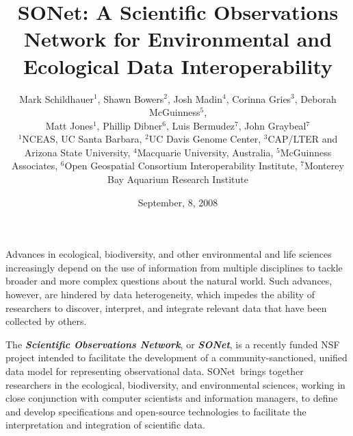\documentclass[10pt,twocolumn]{article}
\newcommand{\mypara}{\vspace{6pt}\noindent}
\newcommand{\sonet}{{SONet}}
\begin{document}

\title{\textbf{\sonet: A Scientific Observations Network for
    Environmental and Ecological Data Interoperability}}

\author{Mark Schildhauer$^1$, Shawn Bowers$^2$, Josh Madin$^4$,
  Corinna Gries$^3$, Deborah McGuinness$^5$, \\
  Matt Jones$^1$, Phillip Dibner$^6$, Luis
  Bermudez$^7$, John Graybeal$^7$ \\[12pt]
  $^1$NCEAS, UC Santa Barbara, $^2$UC Davis Genome Center,
  $^3$CAP/LTER and \\ Arizona State University, $^4$Macquarie
  University, Australia, $^5$McGuinness \\ Associates, $^6$Open
  Geospatial Consortium Interoperability Institute, $^7$Monterey \\
  Bay Aquarium Research Institute}

\date{September, 8, 2008}


\maketitle

\thispagestyle{empty}


\mypara Advances in ecological, biodiversity, and other environmental
and life sciences increasingly depend on the use of information from
multiple disciplines to tackle broader and more complex questions
about the natural world.  Such advances, however, are hindered by data
heterogeneity, which impedes the ability of researchers to discover,
interpret, and integrate relevant data that have been collected by
others.

\mypara The \emph{\textbf{Scientific Observations Network}}, or
  \emph{\textbf{\sonet}}, is a recently funded NSF project intended to
facilitate the development of a community-sanctioned, unified data
model for representing observational data.  \sonet\ brings together
researchers in the ecological, biodiversity, and environmental
sciences, working in close conjunction with computer scientists and
information managers, to define and develop specifications and
open-source technologies to facilitate the interpretation and
integration of scientific data.
\end{document}
